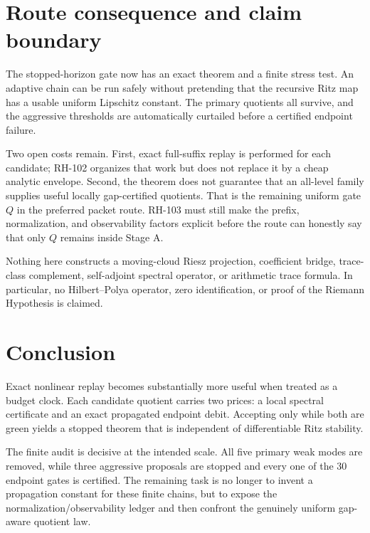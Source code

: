 \documentclass[11pt]{article}
\theoremstyle{definition}
\theoremstyle{remark}
\begin{document}
\section{Route consequence and claim boundary}

The stopped-horizon gate now has an exact theorem and a finite stress test.
An adaptive chain can be run safely without pretending that the recursive
Ritz map has a usable uniform Lipschitz constant.  The primary quotients all
survive, and the aggressive thresholds are automatically curtailed before a
certified endpoint failure.

Two open costs remain.  First, exact full-suffix replay is performed for each
candidate; RH-102 organizes that work but does not replace it by a cheap
analytic envelope.  Second, the theorem does not guarantee that an all-level
family supplies useful locally gap-certified quotients.  That is the
remaining uniform gate $Q$ in the preferred packet route.  RH-103 must still
make the prefix, normalization, and observability factors explicit before
the route can honestly say that only $Q$ remains inside Stage A.

Nothing here constructs a moving-cloud Riesz projection, coefficient bridge,
trace-class complement, self-adjoint spectral operator, or arithmetic trace
formula.  In particular, no Hilbert--Polya operator, zero identification, or
proof of the Riemann Hypothesis is claimed.

\section{Conclusion}

Exact nonlinear replay becomes substantially more useful when treated as a
budget clock.  Each candidate quotient carries two prices: a local spectral
certificate and an exact propagated endpoint debit.  Accepting only while
both are green yields a stopped theorem that is independent of differentiable
Ritz stability.

The finite audit is decisive at the intended scale.  All five primary weak
modes are removed, while three aggressive proposals are stopped and every
one of the 30 endpoint gates is certified.  The remaining task is no longer
to invent a propagation constant for these finite chains, but to expose the
normalization/observability ledger and then confront the genuinely uniform
gap-aware quotient law.



\end{document}
